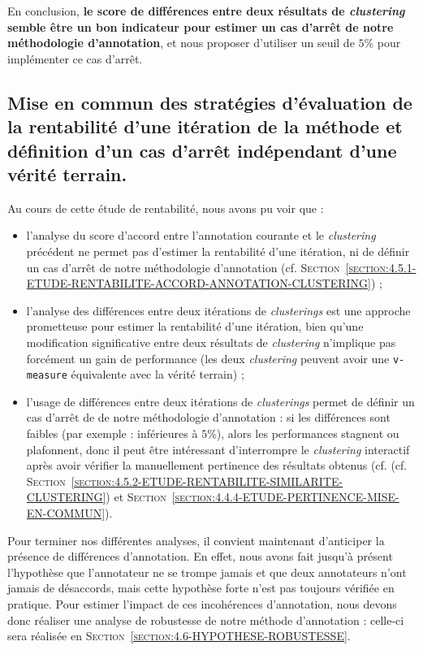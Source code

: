 			En conclusion, \textbf{le score de différences entre deux résultats de \textit{clustering} semble être un bon indicateur pour estimer un cas d'arrêt de notre méthodologie d'annotation}, et nous proposer d'utiliser un seuil de $5$\% pour implémenter ce cas d'arrêt.
			
	\subsection{Mise en commun des stratégies d'évaluation de la rentabilité d'une itération de la méthode et définition d'un cas d'arrêt indépendant d'une vérité terrain.}
	\label{section:4.5.3-ETUDE-RENTABILITE-MISE-EN-COMMUN}
			
		\begin{leftBarSummary}
			Au cours de cette étude de rentabilité, nous avons pu voir que :
			\begin{itemize}
				\item[\itemko] l'analyse du score d'accord entre l'annotation courante et le \textit{clustering} précédent ne permet pas d'estimer la rentabilité d'une itération, ni de définir un cas d'arrêt de notre méthodologie d'annotation (cf. \textsc{Section~\ref{section:4.5.1-ETUDE-RENTABILITE-ACCORD-ANNOTATION-CLUSTERING}}) ;
				\item[\itemok] l'analyse des différences entre deux itérations de \textit{clusterings} est une approche prometteuse pour estimer la rentabilité d'une itération, bien qu'une modification significative entre deux résultats de \textit{clustering} n'implique pas forcément un gain de performance (les deux \textit{clustering} peuvent avoir une \texttt{v-measure} équivalente avec la vérité terrain) ;
				\item[\itemok] l'usage de différences entre deux itérations de \textit{clusterings} permet de définir un cas d'arrêt de de notre méthodologie d'annotation : si les différences sont faibles (par exemple : inférieures à $5$\%), alors les performances stagnent ou plafonnent, donc il peut être intéressant d'interrompre le \textit{clustering} interactif après avoir vérifier la manuellement pertinence des résultats obtenus (cf. (cf. \textsc{Section~\ref{section:4.5.2-ETUDE-RENTABILITE-SIMILARITE-CLUSTERING}}) et \textsc{Section~\ref{section:4.4.4-ETUDE-PERTINENCE-MISE-EN-COMMUN}}).
			\end{itemize}
		\end{leftBarSummary}
		
		Pour terminer nos différentes analyses, il convient maintenant d'anticiper la présence de différences d'annotation.
		En effet, nous avons fait jusqu'à présent l'hypothèse que l'annotateur ne se trompe jamais et que deux annotateurs n'ont jamais de désaccords, mais cette hypothèse forte n'est pas toujours vérifiée en pratique.
		Pour estimer l'impact de ces incohérences d'annotation, nous devons donc réaliser une analyse de robustesse de notre méthode d'annotation : celle-ci sera réalisée en \textsc{Section~\ref{section:4.6-HYPOTHESE-ROBUSTESSE}}.